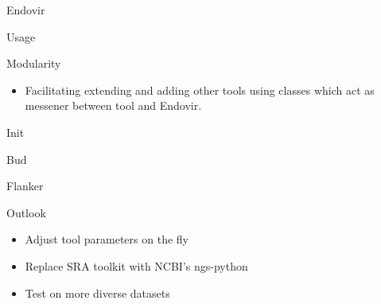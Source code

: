 \documentclass{beamer}
\begin{document}
  \begin{frame}{Endovir}
    \resizebox{\linewidth}{!}{}
  \end{frame}

  \begin{frame}{Usage}
    
  \end{frame}

  \begin{frame}{Modularity}
    \begin{itemize}
     \item Facilitating extending and adding other tools using classes
           which act as messener between tool and Endovir.
    \end{itemize}
    
  \end{frame}

  \begin{frame}{Init}
    \resizebox{\linewidth}{!}{}
  \end{frame}

  \begin{frame}{Bud}
    \resizebox{\linewidth}{!}{}
  \end{frame}

  \begin{frame}{Flanker}
    
  \end{frame}

  \begin{frame}{Outlook}
    \begin{itemize}
     \item Adjust tool parameters on the fly
     \item Replace SRA toolkit with NCBI's ngs-python
     \item Test on more diverse datasets
    \end{itemize}
  \end{frame}
\end{document}
